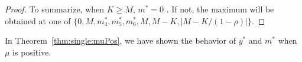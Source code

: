 \documentclass[11pt]{article}
\theoremstyle{plain}
\numberwithin{equation}{section}
\begin{document}
{\begin{proof}
%
%
%
%
%
%
%
%
%
%
%
%
%
%
%
%
%
%
%
%
%
 
To summarize, when $K\geq M$, $m^*=0$ . If not, the maximum will be obtained at one of $\{0, M, m_4^*, m^*_5, m^*_6, M, M-K, |M-K/(1-\rho)| \}$. 



\end{proof}






{



In Theorem~\ref{thm:single:muPos}, we have shown the behavior of $y^*$ and $m^*$ when $\mu$ is positive. 

}}
\end{document}
